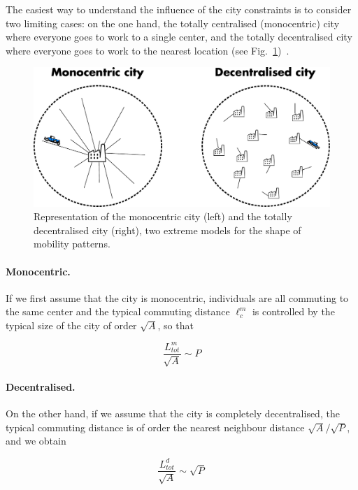 The easiest way to understand the influence of the city constraints is to
consider two limiting cases: on the one hand, the totally centralised
(monocentric) city where everyone goes to work to a single center, and the
totally decentralised city where everyone goes to work to the nearest
location (see Fig.~\ref{fig:monocentric_decentralised})~\cite{Samaniego:2008}.\\

\begin{figure}[!h]
    \centering
    \includegraphics[width=1\textwidth]{gfx/chapter-scaling/monocentric-decentralised.pdf}
    \caption{Representation of the monocentric city (left) and the totally
    decentralised city (right), two extreme models for the shape of mobility
patterns.\label{fig:monocentric_decentralised}}
\end{figure}

\paragraph{Monocentric.} If we first assume that the city is monocentric, individuals are all commuting
to the same center and the typical commuting distance $\ell^m_c$ is controlled
by the typical size of the city of order $\sqrt{A}$, so that

\begin{equation} 
    \frac{L_{tot}^{m}}{\sqrt{A}} \sim P 
\end{equation}

\paragraph{Decentralised.} On the other hand, if we assume that the city is completely decentralised, the
typical commuting distance is of order the nearest neighbour distance
$\sqrt{A}/\sqrt{P}$, and we obtain

\begin{equation} 
    \frac{L_{tot}^{d}}{\sqrt{A}} \sim \sqrt{P} 
\end{equation}

